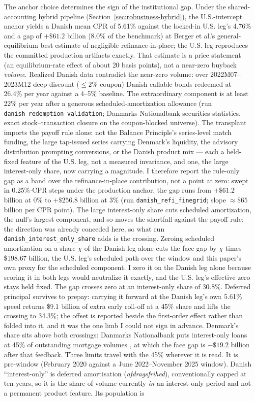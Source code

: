 \documentclass[12pt]{article}
\begin{document}
The anchor choice determines the sign of the institutional gap. Under the shared-accounting hybrid pipeline (Section~\ref{sec:robustness-hybrid}), the U.S.-intercept anchor yields a Danish mean CPR of 5.61\% against the locked-in U.S. leg's 4.76\% and a gap of $+\$61.2$ billion (8.0\% of the benchmark) at Berger et al.'s general-equilibrium best estimate of negligible refinance-in-place; the U.S. leg reproduces the committed production artifacts exactly. That estimate is a price statement (an equilibrium-rate effect of about 20 basis points), not a near-zero buyback \emph{volume}. Realized Danish data contradict the near-zero volume: over 2022M07--2023M12 deep-discount ($\leq 2\%$ coupon) Danish callable bonds redeemed at 26.4\% per year against a 4--5\% baseline. The extraordinary component is at least 22\% per year after a generous scheduled-amortization allowance (run \texttt{danish\_redemption\_validation}; Danmarks Nationalbank securities statistics, exact stock--transaction closure on the coupon-blocked universe). The transplant imports the payoff rule alone: not the Balance Principle's series-level match funding, the large tap-issued series carrying Denmark's liquidity, the advisory distribution prompting conversions, or the Danish product mix --- each a held-fixed feature of the U.S. leg, not a measured invariance, and one, the large interest-only share, now carrying a magnitude. I therefore report the rule-only gap as a band over the refinance-in-place contribution, not a point at zero: swept in 0.25\%-CPR steps under the production anchor, the gap runs from $+\$61.2$ billion at 0\% to $+\$256.8$ billion at 3\% (run \texttt{danish\_refi\_finegrid}; slope $\approx \$65$ billion per CPR point). The large interest-only share cuts scheduled amortization, the null's largest component, and so moves the shortfall against the payoff rule; the direction was already conceded here, so what run \texttt{danish\_interest\_only\_share} adds is the crossing. Zeroing scheduled amortization on a share $\chi$ of the Danish leg alone cuts the face gap by $\chi$ times \$198.67 billion, the U.S. leg's scheduled path over the window and this paper's own proxy for the scheduled component. I zero it on the Danish leg alone because scoring it in both legs would neutralize it exactly, and the U.S. leg's effective zero stays held fixed. The gap crosses zero at an interest-only share of 30.8\%. Deferred principal survives to prepay: carrying it forward at the Danish leg's own 5.61\% speed returns \$9.1 billion of extra early roll-off at a 45\% share and lifts the crossing to 34.3\%; the offset is reported beside the first-order effect rather than folded into it, and it was the one limb I could not sign in advance. Denmark's share sits above both crossings: Danmarks Nationalbank puts interest-only loans at 45\% of outstanding mortgage volumes \citep{nationalbanken2020}, at which the face gap is $-\$19.2$ billion after that feedback. Three limits travel with the 45\% wherever it is read. It is pre-window (February 2020 against a June 2022--November 2025 window). Danish ``interest-only'' is deferred amortisation (\emph{afdragsfrihed}), conventionally capped at ten years, so it is the share of volume currently \emph{in} an interest-only period and not a permanent product feature. Its population is 
\end{document}
